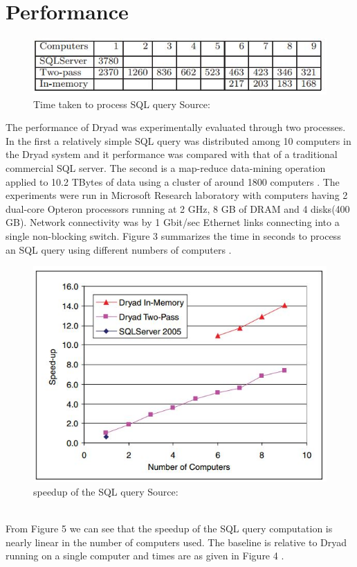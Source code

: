 \documentclass[9pt,twocolumn,twoside]{../../styles/osajnl}
\begin{document}
\section{Performance}
\begin{figure}[htbp]
\begin{center}
\centering
\includegraphics[width=\linewidth]{images/img4}
\caption{Time taken to process SQL query Source:\cite{DryadMSR4}}
\label{fig:false-color}
\end{center}
\end{figure}
The performance of Dryad was experimentally evaluated through two processes. In the first a relatively simple SQL query was distributed among 10 computers in the Dryad system and it performance was compared with that of a traditional commercial SQL server. The second is a map-reduce data-mining operation applied to 10.2 TBytes of data using a cluster of around 1800 computers \cite{DryadMSR4}. The experiments were run in Microsoft Research laboratory with computers having 2 dual-core Opteron processors running at 2 GHz, 8 GB of DRAM and 4 disks(400 GB). Network connectivity was by 1 Gbit/sec Ethernet links connecting into a single non-blocking switch. Figure 3 summarizes the time in seconds to process an SQL query using different numbers of computers \cite{DryadMSR4}.
\begin{figure}[htbp]
\begin{center}
\centering
\includegraphics[width=\linewidth]{images/img5}
\caption{speedup of the SQL query Source:\cite{DryadMSR4}}
\label{fig:false-color}
\end{center}
\end{figure}
\\From Figure 5 we can see that the speedup of the SQL query computation is nearly linear in the number of computers used. The baseline is relative to Dryad running on a single computer and times are as given in Figure 4 \cite{DryadMSR4}.
\end{document}
